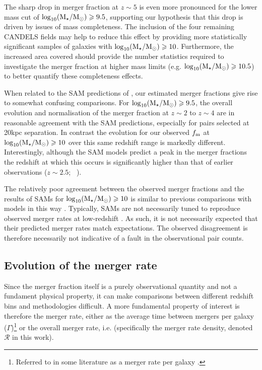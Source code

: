 The sharp drop in merger fraction at $z\sim5$ is even more pronounced for the lower mass cut of $\log_{10}(\text{M}_{\star} / \text{M}_{\odot}) \geqslant 9.5$, supporting our hypothesis that this drop is driven by issues of mass completeness. The inclusion of the four remaining CANDELS fields may help to reduce this effect by providing more statistically significant samples of galaxies with $\log_{10}(\text{M}_{\star} / \text{M}_{\odot}) \geqslant 10$. Furthermore, the increased area covered should provide the number statistics required to investigate the merger fraction at higher mass limits (e.g. $\log_{10}(\text{M}_{\star} / \text{M}_{\odot}) \geqslant 10.5$) to better quantify these completeness effects. 

When related to the SAM predictions of \citet{Lu:2011hj}, our estimated merger fractions give rise to somewhat confusing comparisons. For $\log_{10}(\text{M}_{\star} / \text{M}_{\odot}) \geqslant 9.5$, the overall evolution and normalisation of the merger fraction at $z\sim2$ to $z\sim4$ are in reasonable agreement with the SAM predictions, especially for pairs selected at 20kpc separation. In contrast the evolution for our observed $f_{\rm{m}}$ at $\log_{10}(\text{M}_{\star} / \text{M}_{\odot}) \geqslant 10$ over this same redshift range is markedly different. Interestingly, although the SAM models predict a peak in the merger fractions the redshift at which this occurs is significantly higher than that of earlier observations ($z\sim2.5$; \citeauthor{Conselice:2014ct}~\citeyear{Conselice:2014ct}).

The relatively poor agreement between the observed merger fractions and the results of SAMs for $\log_{10}(\text{M}_{\star} / \text{M}_{\odot}) \geqslant 10$ is similar to previous comparisons with models in this way \citep{Bertone:2009jc,Jogee:2009iz}. Typically, SAMs are not necessarily tuned to reproduce observed merger rates at low-redshift \citep{Lu:2014kl}.  As such, it is not necessarily expected that their predicted merger rates match expectations. The observed disagreement is therefore necessarily not indicative of a fault in the observational pair counts.

\subsection{Evolution of the merger rate}\label{merger-sec:mergerrate}
Since the merger fraction itself is a purely observational quantity and not a fundament physical property, it can make comparisons between different redshift bins and methodologies difficult. A more fundamental property of interest is therefore the merger rate, either as the average time between mergers per galaxy ($\Gamma$)\footnote{Referred to in some literature as a merger rate per galaxy \citep{Conselice:2014ct}.} or the overall merger rate, i.e. (specifically the merger rate density, denoted $\mathcal{R}$ in this work).

